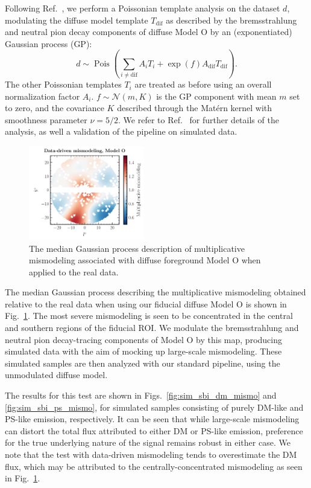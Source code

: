 \documentclass[prd,aps,10pt,nofootinbib,twocolumn,superscriptaddress,preprintnumbers,balancelastpage,longbibliography]{revtex4-1}
\begin{document}
Following Ref.~\cite{Mishra-Sharma:2020kjb}, we perform a Poissonian template analysis on the \Fermi dataset $d$, modulating the diffuse model template $T_{\mathrm{dif}}$ as described by the bremsstrahlung and neutral pion decay components of diffuse Model O by an (exponentiated) Gaussian process (GP):
\begin{equation}
    d \sim \operatorname{Pois}\left(\sum_{i \neq \mathrm{dif}} A_{i} T_{i}+\exp \left(f\right) A_{\mathrm{dif}} T_{\mathrm{dif}}\right).
\end{equation}
The other Poissonian templates $T_{i}$ are treated as before using an overall normalization factor $A_{i}$. $f \sim \mathcal{N}(m, K)$ is the GP component with mean $m$ set to zero, and the covariance $K$ described through the Mat\'ern kernel with smoothness parameter $\nu = 5/2$. We refer to Ref.~\cite{Mishra-Sharma:2020kjb} for further details of the analysis, as well a validation of the pipeline on simulated data.

%
\begin{figure}
    \centering
    \includegraphics[width=0.45\textwidth]{plots/dd_mismo_map.pdf}
    \caption{The median Gaussian process description of multiplicative mismodeling associated with diffuse foreground Model O when applied to the real \Fermi data.}
    \label{fig:dd_mismo_map}
\end{figure}
%

The median Gaussian process describing the multiplicative mismodeling obtained relative to the real \Fermi data when using our fiducial diffuse Model O is shown in Fig.~\ref{fig:dd_mismo_map}. The most severe mismodeling is seen to be concentrated in the central and southern regions of the fiducial ROI. We modulate the bremsstrahlung and neutral pion decay-tracing components of Model O by this map, producing simulated data with the aim of mocking up large-scale mismodeling. These simulated samples are then analyzed with our standard pipeline, using the unmodulated diffuse model.

The results for this test are shown in Figs.~\ref{fig:sim_sbi_dm_mismo} and \ref{fig:sim_sbi_ps_mismo}, for simulated samples consisting of purely DM-like and PS-like emission, respectively. It can be seen that while large-scale mismodeling can distort the total flux attributed to either DM or PS-like emission, preference for the true underlying nature of the signal remains robust in either case. We note that the test with data-driven mismodeling tends to overestimate the DM flux, which may be attributed to the centrally-concentrated mismodeling as seen in Fig.~\ref{fig:dd_mismo_map}.
\end{document}
